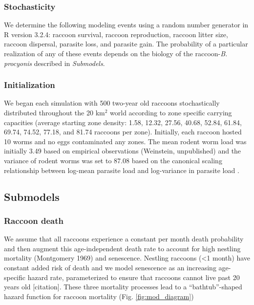 \documentclass[11pt]{article}
\begin{document}
\subsubsection{Stochasticity}

We determine the following modeling events using a random number generator in R version 3.2.4: raccoon survival, raccoon reproduction, raccoon litter size, raccoon dispersal, parasite loss, and parasite gain.  The probability of a particular realization of any of these events depends on the biology of the raccoon-\emph{B. procyonis} described in \emph{Submodels}.

\subsubsection{Initialization}

We began each simulation with 500 two-year old raccoons stochastically
distributed throughout the 20 km$^2$ world according to
zone specific carrying capacities (average starting zone density: 1.58, 12.32, 27.56, 40.68, 52.84, 61.84, 69.74, 74.52, 77.18, and 81.74 raccoons per zone).
Initially, each raccoon hosted 10 worms and no eggs contaminated any
zones. The mean rodent worm load was initially 3.49 based on
empirical observations (Weinstein, unpublished) and the variance of rodent worms
was set to 87.08 based on the canonical scaling relationship between
log-mean parasite load and log-variance in parasite load \citep{Shaw1995}.

\subsection{Submodels}

\subsubsection{Raccoon death}

We assume that all raccoons experience a constant per month death
probability and then augment this age-independent death rate to account
for high nestling mortality (Montgomery 1969) and senescence. Nestling
raccoons (\textless{}1 month) have constant added risk of death and we
model senescence as an increasing age-specific hazard rate,
parameterized to ensure that raccoons cannot live past 20 years old [citation].
These three mortality processes lead to a ``bathtub''-shaped hazard
function for raccoon mortality (Fig. \ref{fig:mod_diagram})
\end{document}
